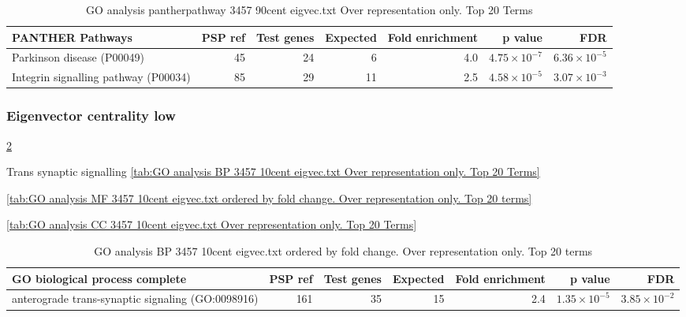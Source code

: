 \begin{table}[ht]
\centering
\begin{adjustbox}{width=\textwidth}
\begin{tabular}{lrrrrrr}
  \hline
PANTHER Pathways & PSP ref & Test genes & Expected & Fold enrichment & p value & FDR \\ 
  \hline
Parkinson disease (P00049) & 45 & 24 & 6 & 4.0 & $4.75 \times 10^{-7}$ & $6.36 \times 10^{-5}$ \\ 
  Integrin signalling pathway (P00034) & 85 & 29 & 11 & 2.5 & $4.58 \times 10^{-5}$ & $3.07 \times 10^{-3}$ \\ 
   \hline
\end{tabular}
\end{adjustbox}
\caption{GO analysis pantherpathway 3457 90cent eigvec.txt Over representation only. Top 20 Terms} 
\label{tab:GO analysis pantherpathway 3457 90cent eigvec.txt Over representation only. Top 20 Terms}
\end{table}

\subsubsection{Eigenvector centrality low}

\ref{tab:GO analysis BP 3457 10cent eigvec.txt ordered by fold change. Over representation only. Top 20 terms}

Trans synaptic signalling \ref{tab:GO analysis BP 3457 10cent eigvec.txt Over representation only. Top 20 Terms}

\ref{tab:GO analysis MF 3457 10cent eigvec.txt ordered by fold change. Over representation only. Top 20 terms}

\ref{tab:GO analysis CC 3457 10cent eigvec.txt Over representation only. Top 20 Terms}

\begin{table}[ht]
\centering
\begin{adjustbox}{width=\textwidth}
\begin{tabular}{lrrrrrr}
  \hline
GO biological process complete & PSP ref & Test genes & Expected & Fold enrichment & p value & FDR \\ 
  \hline
anterograde trans-synaptic signaling (GO:0098916) & 161 & 35 & 15 & 2.4 & $1.35 \times 10^{-5}$ & $3.85 \times 10^{-2}$ \\ 
   \hline
\end{tabular}
\end{adjustbox}
\caption{GO analysis BP 3457 10cent eigvec.txt ordered by fold change. Over representation only. Top 20 terms} 
\label{tab:GO analysis BP 3457 10cent eigvec.txt ordered by fold change. Over representation only. Top 20 terms}
\end{table}


